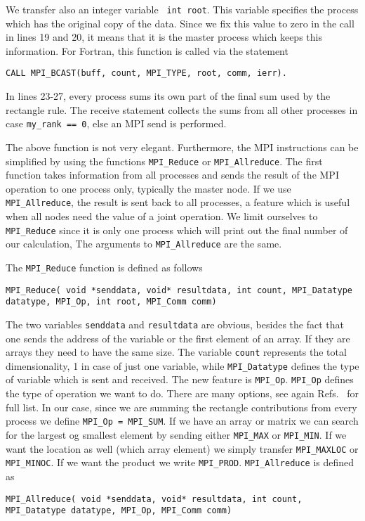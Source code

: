 We transfer also an integer variable \verb? int root?.  This variable specifies 
the process which has  the original copy of the data. 
Since we fix this value to zero in the call in lines 19 and 20,
it means that it is the master process which keeps this information. 
For Fortran, this function is called via the statement 
\begin{lstlisting}
CALL MPI_BCAST(buff, count, MPI_TYPE, root, comm, ierr).
\end{lstlisting}
In lines  23-27, every process sums its own part of the final sum used by the rectangle rule. The receive statement collects
the sums from all other processes in case \lstinline{my_rank == 0}, else an MPI send is performed.

The above function is not very elegant. Furthermore, the MPI instructions can be simplified by using the
functions \lstinline{MPI_Reduce} or \lstinline{MPI_Allreduce}.
The first function takes information from all processes and sends the result of the MPI operation to one process only,
typically the master node.  If we use \lstinline{MPI_Allreduce}, the result is sent back to all processes, a feature which is
useful when all nodes need the value of a joint operation.  We limit ourselves to \lstinline{MPI_Reduce} since it is only one 
process which will print out the final number of our calculation, The arguments to \lstinline{MPI_Allreduce} are the same.  

The \lstinline{MPI_Reduce} function is defined as follows
\begin{lstlisting}
MPI_Reduce( void *senddata, void* resultdata, int count, MPI_Datatype datatype, MPI_Op, int root, MPI_Comm comm)
\end{lstlisting}
The two variables \lstinline{senddata} and \lstinline{resultdata} are obvious, besides the fact that one sends the address
of the variable or the first element of an array.  If they are arrays they need to have the same size. 
The variable \lstinline{count} represents the total dimensionality, 1 in case of just one variable, while \lstinline{MPI_Datatype} 
defines the type of variable which is sent and received.  The new feature is \lstinline{MPI_Op}.  \lstinline{MPI_Op} defines the type
of operation we want to do. 
There are many options, see again Refs.~\cite{mpiref,cmpi,gropp1999} for full list.  In our case, since we are summing
the rectangle  contributions from every process we define  \lstinline{MPI_Op = MPI_SUM}.
If we have an array or matrix we can search for the largest og smallest element by sending either \lstinline{MPI_MAX} or 
\lstinline{MPI_MIN}.  If we want the location as well (which array element) we simply transfer 
\lstinline{MPI_MAXLOC} or \lstinline{MPI_MINOC}. If we want the product we write \lstinline{MPI_PROD}. 
\lstinline{MPI_Allreduce} is defined as
\begin{lstlisting}     
MPI_Allreduce( void *senddata, void* resultdata, int count, MPI_Datatype datatype, MPI_Op, MPI_Comm comm)
\end{lstlisting}        

